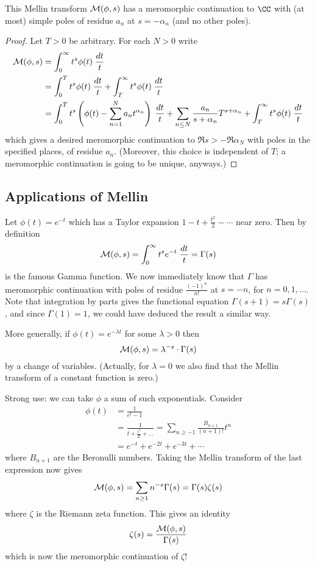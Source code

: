 \begin{theorem}
  This Mellin transform $\mathcal M(\phi, s)$
  has a meromorphic continuation to $\CC$
  with (at most) simple poles of residue
  $a_n$ at $s=-\alpha_n$ (and no other poles).
\end{theorem}
\begin{proof}
  Let $T > 0$ be arbitrary.
  For each $N > 0$ write
  \begin{align*}
    \mathcal M(\phi, s)
    &= \int_0^\infty t^s \phi(t) \; \frac{dt}{t} \\
    &= \int_0^T t^s \phi(t) \; \frac{dt}{t}
    + \int_T^\infty t^s \phi(t) \; \frac{dt}{t} \\
    &= \int_0^T t^s
      \left( \phi(t) - \sum_{n=1}^N
      a_n t^{\alpha_n} \right)
      \; \frac{dt}{t}
      + \sum_{n \le N} \frac{a_n}{s+\alpha_n} T^{s+\alpha_n}
    + \int_T^\infty t^s \phi(t) \; \frac{dt}{t}
  \end{align*}
  which gives a desired meromorphic
  continuation to $\Re s > - \Re \alpha_N$
  with poles in the specified places,
  of residue $a_n$.
  (Moreover, this choice is independent of $T$;
  a meromorphic continuation is going to be unique, anyways.)
\end{proof}

\subsection{Applications of Mellin}
\begin{itemize}
  \ii Let $\phi(t) = e^{-t}$
  which has a Taylor expansion $1 - t + \frac{t^2}{2} - \cdots$
  near zero.
  Then by definition
  \[ \mathcal M(\phi, s) = \int_0^{\infty} t^s e^{-t} \; \frac{dt}{t}
    = \Gamma(s) \]
  is the famous Gamma function.
  We now immediately know that $\Gamma$
  has meromorphic continuation
  with poles of residue $\frac{(-1)^n}{n!}$
  at $s = -n$, for $n = 0, 1, \dots$.
  Note that integration by parts gives the functional equation
  $\Gamma(s+1) = s \Gamma(s)$,
  and since $\Gamma(1) = 1$,
  we could have deduced the result a similar way.

  \ii More generally, if $\phi(t) = e^{-\lambda t}$
  for some $\lambda > 0$ then
  \[ \mathcal M(\phi, s) = \lambda^{-s} \cdot \Gamma(s) \]
  by a change of variables.
  (Actually, for $\lambda = 0$ we also find that the Mellin
  transform of a constant function is zero.)
\end{itemize}

Strong use: we can take $\phi$ a sum of such exponentials.
Consider
\begin{align*}
\phi(t) &= \frac{1}{e^t-1} \\
&= \frac{1}{t + \frac{t^2}{2!} + \dots}
= \sum_{n \ge -1} \frac{B_{n+1}}{(n+1)!} t^n \\
&= e^{-t} + e^{-2t} + e^{-3t} + \cdots
\end{align*}
where $B_{n+1}$ are the Beronulli numbers.
Taking the Mellin transform of the last expression now gives
\[ \mathcal M(\phi, s) = \sum_{n \ge 1} n^{-s} \Gamma(s)
= \Gamma(s) \zeta(s) \]
where $\zeta$ is the Riemann zeta function.
This gives an identity
\[ \zeta(s) = \frac{\mathcal M(\phi, s)}{\Gamma(s)} \]
which is now the meromorphic continuation of $\zeta$!

